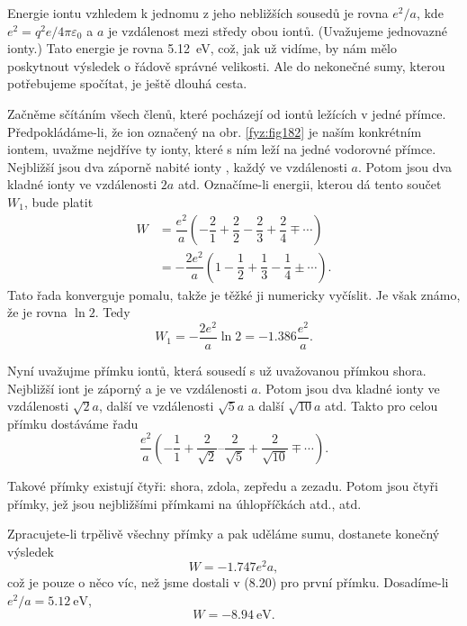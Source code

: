     Energie iontu vzhledem k jednomu z jeho nebližších sousedů je rovna \(e^2/a\), kde
    \(e^2=q^2e/4π\varepsilon_0\) a \(a\) je vzdálenost mezi středy obou iontů. (Uvažujeme jednovazné
    ionty.) Tato energie je rovna \SI{5.12}{\electronvolt}, což, jak už vidíme, by nám mělo
    poskytnout výsledek o řádově správné velikosti. Ale do nekonečné sumy, kterou potřebujeme
    spočítat, je ještě dlouhá cesta.

    Začněme sčítáním všech členů, které pocházejí od iontů ležících v jedné přímce.
    Předpokládáme-li, že ion označený  na obr. \ref{fyz:fig182} je naším konkrétním iontem,
    uvažme nejdříve ty ionty, které s ním leží na jedné vodorovné přímce. Nejbližší jsou dva záporně
    nabité ionty , každý ve vzdálenosti \(a\). Potom jsou dva kladné ionty ve vzdálenosti
    \(2a\) atd. Označíme-li energii, kterou dá tento součet \(W_1\), bude platit
    \begin{align*}
      W &= \dfrac{e^2}{a}\left(−\dfrac{2}{1}+\dfrac{2}{2}−\dfrac{2}{3}+\dfrac{2}{4}∓\cdots\right) \\
        &=−\dfrac{2e^2}{a}\left(1−\dfrac{1}{2}+\dfrac{1}{3}−\dfrac{1}{4}±\cdots\right).
    \end{align*}
    Tato řada konverguje pomalu, takže je těžké ji numericky vyčíslit. Je však známo, že je rovna
    \(\ln2\). Tedy
    \begin{equation}\label{fyz:eq886}
      W_1=−\dfrac{2e^2}{a}\ln2=−\num{1.386}\dfrac{e^2}{a}.
    \end{equation}

    Nyní uvažujme přímku iontů, která sousedí s už uvažovanou přímkou shora. Nejbližší iont je
    záporný a je ve vzdálenosti \(a\). Potom jsou dva kladné ionty ve vzdálenosti \(\sqrt{2}a\),
    další ve vzdálenosti \(\sqrt{5}a\) a další \(\sqrt{10}a\) atd. Takto pro celou přímku dostáváme
    řadu
    \begin{equation}\label{fyz:eq887}
      \dfrac{e^2}{a}\left(−\dfrac{1}{1}+\dfrac{2}{\sqrt{2}}
                          –\dfrac{2}{\sqrt{5}}+\dfrac{2}{\sqrt{10}}∓\cdots
                    \right).
    \end{equation}

    Takové přímky existují čtyři: shora, zdola, zepředu a zezadu. Potom jsou čtyři přímky, jež jsou
    nejbližšími přímkami na úhlopříčkách atd., atd.

    Zpracujete-li trpělivě všechny přímky a pak uděláme sumu, dostanete konečný výsledek
    \begin{equation*}
      W=−\num{1.747}e^2a,
    \end{equation*}
    což je pouze o něco víc, než jsme dostali v (8.20) pro první přímku. Dosadíme-li \(e^2/a =
    \SI{5.12}{\electronvolt}\), 
    \begin{equation*}
      W=−\SI{8.94}{\electronvolt}.
    \end{equation*}

